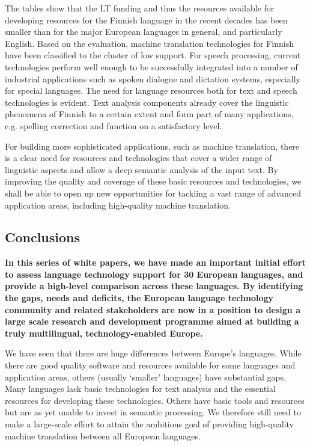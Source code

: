 \documentclass[]{../../metanetpaper}
\begin{document}
\begin{multicols}{2}
The tables
show that the LT funding and thus the resources available for
developing resources for the Finnish language in the recent decades has been
smaller than for the major European languages in general, and particularly
English. Based on the evaluation, machine translation technologies for Finnish
have been classified to the cluster of low support. For speech processing,
current technologies perform well enough to be successfully integrated into a
number of industrial applications such as spoken dialogue and dictation
systems, especially for special languages. The need for language resources both
for text and speech technologies is evident. Text analysis components already
cover the linguistic phenomena of Finnish to a certain extent and form part of
many applications, e.g. spelling correction and function on a satisfactory
level.

For building more sophisticated applications, such as machine translation,
there is a clear need for resources and technologies that cover a wider range
of linguistic aspects and allow a deep semantic analysis of the input text. By
improving the quality and coverage of these basic resources and technologies,
we shall be able to open up new opportunities for tackling a vast range of
advanced application areas, including high-quality machine translation.

\subsection{Conclusions}


\textbf{In this series of white papers, we have made an important
initial effort to assess language technology support for 30 European
languages, and provide a high-level comparison across these
languages. By identifying the gaps, needs and deficits, the European
language technology community and related stakeholders are now in a
position to design a large scale research and development programme
aimed at building a truly multilingual, technology-enabled Europe.}

We have seen that there are huge differences between Europe’s
languages. While there are good quality software and resources
available for some languages and application areas, others (usually
‘smaller’ languages) have substantial gaps.  Many languages lack basic
technologies for text analysis and the essential resources for
developing these technologies. Others have basic tools and resources
but are as yet unable to invest in semantic processing. We therefore
still need to make a large-scale effort to attain the ambitious goal
of providing high-quality machine translation between all European
languages.


\end{multicols}
\end{document}
